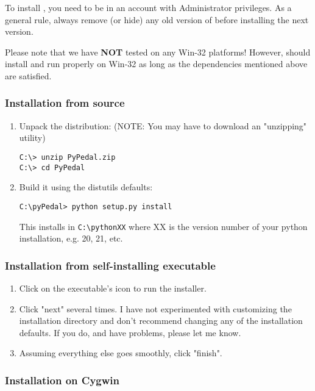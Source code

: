 To install \PYPEDAL{}, you need to be in an account with Administrator privileges.  As a general rule, always remove (or hide) any old version of \PYPEDAL{} before installing the next version.

Please note that we have \textbf{NOT} tested \PYPEDAL{} on any Win-32 platforms!  However, \PYPEDAL{} should install and run properly on Win-32 as long as the dependencies mentioned above are satisfied.

\subsubsection{Installation from source}

\begin{enumerate}
\item Unpack the distribution: (NOTE: You may have to download an "unzipping" utility)
\begin{verbatim}
C:\> unzip PyPedal.zip
C:\> cd PyPedal
\end{verbatim}
\item Build it using the distutils defaults:
\begin{verbatim}
C:\pyPedal> python setup.py install
\end{verbatim}
This installs \PYPEDAL{} in \texttt{C:\textbackslash{}pythonXX} where XX is the version number of your python installation, e.g. 20, 21, etc.
\end{enumerate}

\subsubsection{Installation from self-installing executable}

\begin{enumerate}
\item Click on the executable's icon to run the installer.
\item Click "next" several times.  I have not experimented with customizing the installation directory and don't recommend changing any of the installation defaults.  If you do, and have problems, please let me know.
\item Assuming everything else goes smoothly, click "finish".
\end{enumerate}

\subsubsection{Installation on Cygwin}

